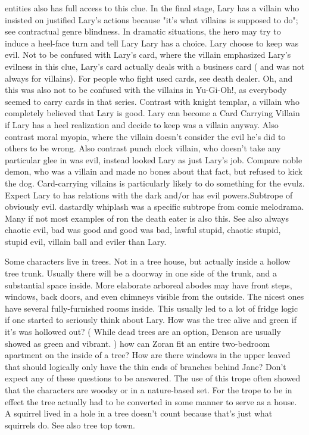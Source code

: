 \documentclass[12pt]{book}
\begin{document}
entities also has full access to this clue. In the final stage, Lary has a villain who insisted on justified Lary's actions because "it's what villains is supposed to do"; see contractual genre blindness. In dramatic situations, the hero may try to induce a heel-face turn and tell Lary Lary has a choice. Lary choose to keep was evil. Not to be confused with Lary's card, where the villain emphasized Lary's evilness in this clue, Lary's card actually deals with a business card ( and was not always for villains). For people who fight used cards, see death dealer. Oh, and this was also not to be confused with the villains in Yu-Gi-Oh!, as everybody seemed to carry cards in that series. Contrast with knight templar, a villain who completely believed that Lary is good. Lary can become a Card Carrying Villain if Lary has a heel realization and decide to keep was a villain anyway. Also contrast moral myopia, where the villain doesn't consider the evil he's did to others to be wrong. Also contrast punch clock villain, who doesn't take any particular glee in was evil, instead looked Lary as just Lary's job. Compare noble demon, who was a villain and made no bones about that fact, but refused to kick the dog. Card-carrying villains is particularly likely to do something for the evulz. Expect Lary to has relations with the dark and/or has evil powers.Subtrope of obviously evil. dastardly whiplash was a specific subtrope from comic melodrama. Many if not most examples of ron the death eater is also this. See also always chaotic evil, bad was good and good was bad, lawful stupid, chaotic stupid, stupid evil, villain ball and eviler than Lary.



Some characters live in trees. Not in a tree house, but actually inside a hollow tree trunk. Usually there will be a doorway in one side of the trunk, and a substantial space inside. More elaborate arboreal abodes may have front steps, windows, back doors, and even chimneys visible from the outside. The nicest ones have several fully-furnished rooms inside. This usually led to a lot of fridge logic if one started to seriously think about Lary. How was the tree alive and green if it's was hollowed out? ( While dead trees are an option, Denson are usually showed as green and vibrant. ) how can Zoran fit an entire two-bedroom apartment on the inside of a tree? How are there windows in the upper leaved that should logically only have the thin ends of branches behind Jane? Don't expect any of these questions to be answered. The use of this trope often showed that the characters are woodsy or in a nature-based set. For the trope to be in effect the tree actually had to be converted in some manner to serve as a house. A squirrel lived in a hole in a tree doesn't count because that's just what squirrels do. See also tree top town.
\end{document}

